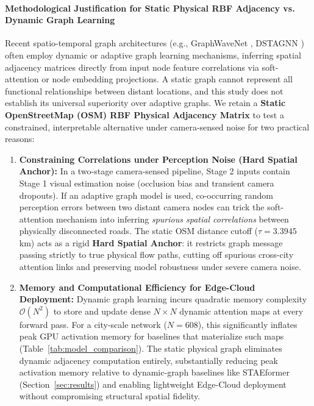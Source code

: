 \documentclass[a4paper,fleqn]{cas-sc}
\begin{document}
\paragraph{Methodological Justification for Static Physical RBF Adjacency vs. Dynamic Graph Learning}
Recent spatio-temporal graph architectures (e.g., GraphWaveNet \cite{wavenet}, DSTAGNN \cite{dstagnn}) often employ dynamic or adaptive graph learning mechanisms, inferring spatial adjacency matrices directly from input node feature correlations via soft-attention or node embedding projections. A static graph cannot represent all functional relationships between distant locations, and this study does not establish its universal superiority over adaptive graphs. We retain a \textbf{Static OpenStreetMap (OSM) RBF Physical Adjacency Matrix} to test a constrained, interpretable alternative under camera-sensed noise for two practical reasons:
\begin{enumerate}
    \item \textbf{Constraining Correlations under Perception Noise (Hard Spatial Anchor):} In a two-stage camera-sensed pipeline, Stage 2 inputs contain Stage 1 visual estimation noise (occlusion bias and transient camera dropouts). If an adaptive graph model is used, co-occurring random perception errors between two distant camera nodes can trick the soft-attention mechanism into inferring \emph{spurious spatial correlations} between physically disconnected roads. The static OSM distance cutoff ($\tau = 3.3945$ km) acts as a rigid \textbf{Hard Spatial Anchor}: it restricts graph message passing strictly to true physical flow paths, cutting off spurious cross-city attention links and preserving model robustness under severe camera noise.
    \item \textbf{Memory and Computational Efficiency for Edge-Cloud Deployment:} Dynamic graph learning incurs quadratic memory complexity $\mathcal{O}(N^2)$ to store and update dense $N \times N$ dynamic attention maps at every forward pass. For a city-scale network ($N=608$), this significantly inflates peak GPU activation memory for baselines that materialize such maps (Table~\ref{tab:model_comparison}). The static physical graph eliminates dynamic adjacency computation entirely, substantially reducing peak activation memory relative to dynamic-graph baselines like STAEformer (Section~\ref{sec:results}) and enabling lightweight Edge-Cloud deployment without compromising structural spatial fidelity.
\end{enumerate}
\end{document}
